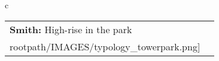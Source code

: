 \begin{table}[H]
        \begin{tabular}{c}
        \begin{tabular}{m{1.5in} m{2in}}
\textbf{Smith:} {High-rise in the park} & \texttt{[image: \\rootpath/IMAGES/typology\_towerpark.png]}
\end{tabular}\end{tabular}
        \end{table}